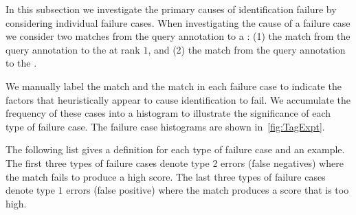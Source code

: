         In this subsection we investigate the primary causes of identification failure by considering individual
          failure cases.
        When investigating the cause of a failure case we consider two matches from the query annotation to a
          \name{}:
        (1) the match from the query annotation to the \groundfalse{} \name{} at rank $1$, and
        (2) the match from the query annotation to the \groundtrue{} \name{}.

        We manually label the \groundtrue{} match and the \groundfalse{} match in each failure case to indicate
          the factors that heuristically appear to cause identification to fail.
        We accumulate the frequency of these cases into a histogram to illustrate the significance of each type
          of failure case.
        The failure case histograms are shown in~\cref{fig:TagExpt}.

        \TagExpt{}

        The following list gives a definition for each type of failure case and an example.
        The first three types of failure cases denote type 2 errors (false negatives) where the \groundtrue{}
          match fails to produce a high score.
        The last three types of failure cases denote type $1$ errors (false positive) where the \groundfalse{}
          match produces a score that is too high.


